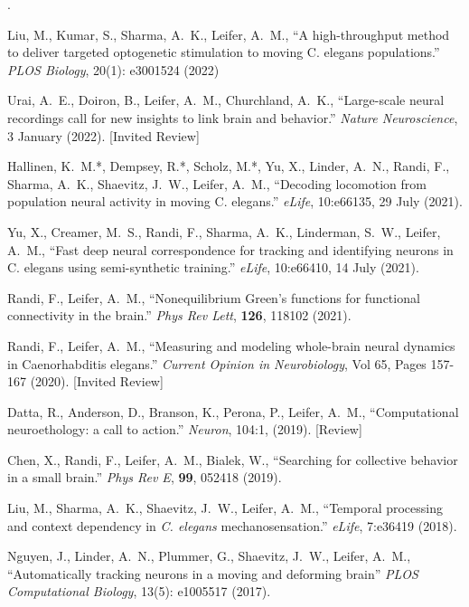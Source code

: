 \documentclass[11pt]{article}
\makeatletter
\newlength{\bibhang}
\newlength{\bibsep}
\newcounter{Lcount}
 {\@listi \global\bibsep\itemsep \global\advance\bibsep by\parsep}
\newenvironment{bibsection}%
        {\begin{list}{\arabic{Lcount}.}{%
       \usecounter{Lcount}%
       \setlength\labelwidth{-0.5em}%
       \setlength{\leftmargin}{\bibhang}%
       \setlength{\itemindent}{-\leftmargin}%
       \setlength{\itemsep}{.2\baselineskip}%
       \setlength{\parsep}{\z@}%
        \setlength{\partopsep}{0pt}%
        \setlength{\topsep}{0pt}}}
        {\end{list}\vspace{-.9\baselineskip}}
\makeatother
\begin{document}
\begin{bibsection}
\item Liu, M., Kumar, S., Sharma, A.~K., Leifer, A.~M., ``A high-throughput method to deliver targeted optogenetic stimulation to moving C. elegans populations.'' \textit{PLOS Biology}, 20(1): e3001524 (2022)

\item Urai, A.~E., Doiron, B., Leifer, A.~M., Churchland, A.~K., ``Large-scale neural recordings call for new insights to link brain and behavior.'' \textit{Nature Neuroscience}, 3 January (2022). [Invited Review]

\item Hallinen, K.~M.*, Dempsey, R.*, Scholz, M.*, Yu, X., Linder, A.~N., Randi, F., Sharma, A.~K., Shaevitz, J.~W., Leifer, A.~M., ``Decoding locomotion from population neural activity in moving C. elegans.'' \emph{eLife}, 10:e66135, 29 July (2021).

\item Yu, X., Creamer, M.~S., Randi, F., Sharma, A.~K., Linderman, S.~W., Leifer, A.~M., ``Fast deep neural correspondence for tracking and identifying neurons in C. elegans using semi-synthetic training.'' \emph{eLife}, 10:e66410, 14 July (2021).

\item Randi, F., Leifer, A.~M., ``Nonequilibrium Green's functions for functional connectivity in the brain.'' \emph{Phys Rev Lett}, \textbf{126}, 118102 (2021).

\item Randi, F., Leifer, A.~M., ``Measuring and modeling whole-brain neural dynamics in Caenorhabditis elegans.'' \emph{Current Opinion in Neurobiology}, Vol 65, Pages 157-167 (2020). [Invited Review]

\item Datta, R., Anderson, D., Branson, K., Perona, P., Leifer, A.~M., ``Computational neuroethology: a call to action.'' \emph{Neuron}, 104:1, (2019). [Review]

\item Chen, X., Randi, F., Leifer, A.~M., Bialek, W., ``Searching for collective behavior in a small brain.'' \emph{Phys Rev E}, \textbf{99}, 052418 (2019).

\item Liu, M., Sharma, A.~K., Shaevitz, J.~W., Leifer, A.~M., ``Temporal processing and context dependency in \textit{C. elegans} mechanosensation.'' \emph{eLife}, 7:e36419 (2018).   

\item Nguyen, J., Linder, A.~N., Plummer, G., Shaevitz, J.~W., Leifer, A.~M., ``Automatically tracking neurons in a moving and deforming brain'' \emph{PLOS Computational Biology}, 13(5): e1005517 (2017).


\end{bibsection}
\end{document}
